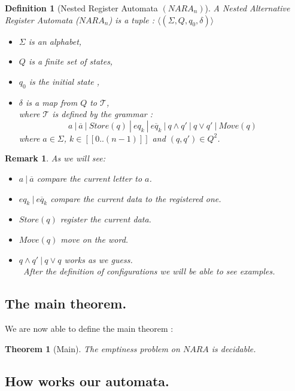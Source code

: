 \documentclass[a4paper,10pt]{report}
\newtheorem{thr}{Theorem} %
\newtheorem{df}{Definition}
\newtheorem{rk}{Remark}
\newcommand{\seg}[1]{[\![#1]\!]}
\newcommand{\ts}{\seg{0 .. (n-1)}}
\begin{document}
\begin{df}[Nested Register Automata $(NARA_n)$]
  A Nested Alternative Register Automata ($NARA_n$) is a tuple : 
  $\langle (\Sigma ,Q ,q_0, \delta )  \rangle$
  \begin{itemize}
   \item $\Sigma$ is an alphabet,
   \item $Q$ is a finite set of states,
   \item $q_0$ is the initial state ,
   \item $ \delta $ is a map from $Q $ to $\mathcal{T} $, \\ 
   where $\mathcal{T}$ is defined by the grammar : 
   $$ a \ | \  \overline{a} \ | \ Store(q) \ | \ eq_k \ | \  \overline{eq_k} \ | \  q \wedge q' \ | \ q \vee q' \ | \ Move(q)  $$
  where $a \in \Sigma$, $k \in  \ts$ and $(q,q') \in Q^2$.
  \end{itemize}

\end{df}
\begin{rk}
  As we will see: 
  \begin{itemize}
   \item $ a \ | \  \overline{a}$ compare the current letter to $a$.
   \item $eq_k \ | \  \overline{eq_k}$ compare the current data to the registered one.
   \item $Store(q)$ register the current data.
   \item $Move(q)$ move on the word.
   \item $q \wedge q' \ | \ q \vee q$  works as we guess.\\\
    After the definition of configurations we will be able to see examples.
  \end{itemize}
 
\end{rk}


\subsection{The main theorem.}

  We are now able to define the main theorem : 


\begin{thr}[Main]
  \label{main}
 The emptiness problem on $NARA$ is decidable.
\end{thr}


\subsection{How works our automata.}
\end{document}
